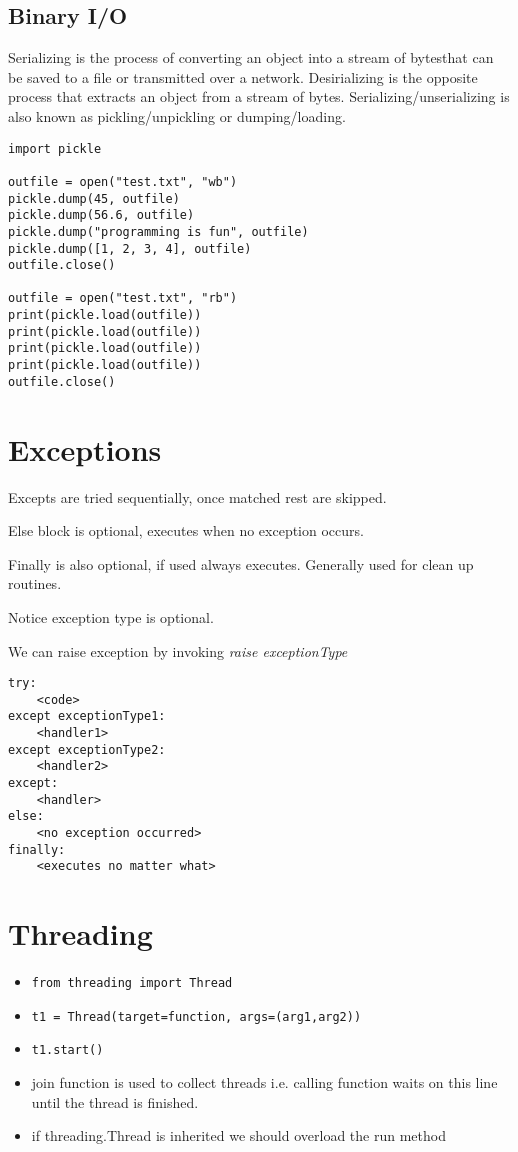\documentclass[a4paper, 12pt]{article}
\begin{document}
\subsection{Binary I/O}
Serializing is the process of converting an object into a stream of bytesthat can be saved to a file or transmitted over a network. Desirializing is the opposite process that extracts an object from a stream of bytes. Serializing/unserializing is also known as pickling/unpickling or dumping/loading.
\begin{verbatim}
import pickle

outfile = open("test.txt", "wb")
pickle.dump(45, outfile)
pickle.dump(56.6, outfile)
pickle.dump("programming is fun", outfile)
pickle.dump([1, 2, 3, 4], outfile)
outfile.close()

outfile = open("test.txt", "rb")
print(pickle.load(outfile))
print(pickle.load(outfile))
print(pickle.load(outfile))
print(pickle.load(outfile))
outfile.close()
\end{verbatim}

\section{Exceptions}
Excepts are tried sequentially, once matched rest are skipped.

Else block is optional, executes when no exception occurs.

Finally is also optional, if used always executes. Generally used for clean up routines.

Notice exception type is optional.

We can raise exception by invoking \emph{raise exceptionType}
\begin{verbatim}
try:
    <code>
except exceptionType1:
    <handler1>
except exceptionType2:
    <handler2>
except:
    <handler>
else:
    <no exception occurred>
finally:
    <executes no matter what>
\end{verbatim}

\section{Threading}
\begin{itemize}
    \item \verb|from threading import Thread|
    \item \verb|t1 = Thread(target=function, args=(arg1,arg2))|
    \item \verb|t1.start()|
    \item join function is used to collect threads i.e. calling function waits on this line until the thread is finished.
    \item if threading.Thread is inherited we should overload the run method
\end{itemize}
\end{document}
